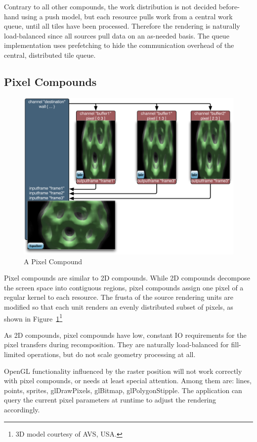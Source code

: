 \documentclass[10pt,a4]{scrartcl}
\newcommand{\fig}[1]{Figure~\ref{#1}}
\begin{document}
Contrary to all other compounds, the work distribution is not decided
before-hand using a push model, but each resource pulls work from a central work
queue, until all tiles have been processed. Therefore the rendering is naturally
load-balanced since all sources pull data on an as-needed basis. The queue
implementation uses prefetching to hide the communication overhead of the
central, distributed tile queue.

\subsection{Pixel Compounds}

\begin{figure}
  \vspace{-2ex}\includegraphics[width=.618\textwidth]{images/Pixel.pdf}
  {\caption{\label{fPixel}\small A Pixel Compound}}\vspace{-8ex}
\end{figure}
Pixel compounds are similar to 2D compounds. While 2D compounds decompose the
screen space into contiguous regions, pixel compounds assign one pixel of a
regular kernel to each resource. The frusta of the source rendering units are
modified so that each unit renders an evenly distributed subset of pixels, as
shown in \fig{fPixel}\footnote{3D model courtesy of AVS, USA.}

As 2D compounds, pixel compounds have low, constant IO requirements for the
pixel transfers during recomposition. They are naturally load-balanced for
fill-limited operations, but do not scale geometry processing at all.

OpenGL functionality influenced by the raster position will not work
correctly with pixel compounds, or needs at least special
attention. Among them are: lines, points, sprites, glDrawPixels,
glBitmap, glPolygonStipple. The application can query the current pixel
parameters at runtime to adjust the rendering accordingly.
\end{document}
